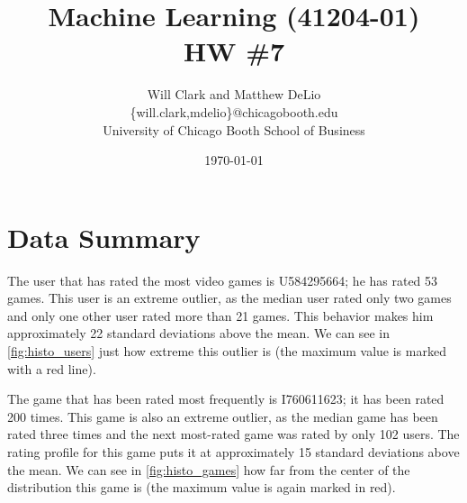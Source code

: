 



\title{Machine Learning (41204-01)\\HW \#7}
\author{Will Clark and Matthew DeLio \\
\textsf{\{will.clark,mdelio\}@chicagobooth.edu} \\
University of Chicago Booth School of Business}
\date{\today}
\maketitle

\section{Data Summary}

The user that has rated the most video games is \textsf{U584295664}; he has rated 53 games. This user is an extreme outlier, as the median user rated only two games and only one other user rated more than 21 games. This behavior makes him approximately 22 standard deviations above the mean. We can see in \cref{fig:histo_users} just how extreme this outlier is (the maximum value is marked with a red line).

The game that has been rated most frequently is \textsf{I760611623}; it has been rated 200 times. This game is also an extreme outlier, as the median game has been rated three times and the next most-rated game was rated by only 102 users. The rating profile for this game puts it at approximately 15 standard deviations above the mean. We can see in \cref{fig:histo_games} how far from the center of the distribution this game is (the maximum value is again marked in red).

